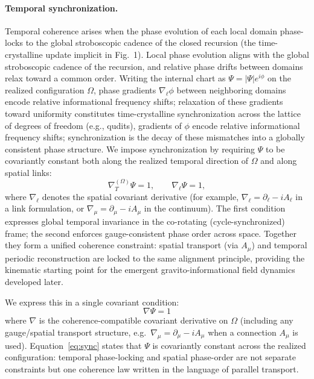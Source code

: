 \documentclass[11pt]{article}
\begin{document}
\paragraph{Temporal synchronization.}
Temporal coherence arises when the phase evolution of each local domain phase-locks to the global stroboscopic cadence of the closed recursion (the time-crystalline update implicit in Fig.~1). Local phase evolution aligns with the global stroboscopic
cadence of the recursion, and relative phase drifts between domains relax toward a common order. Writing the internal chart as $\Psi=|\Psi|e^{i\phi}$ on the realized configuration $\Omega$, phase gradients $\nabla_{\ell}\phi$ between neighboring domains encode relative informational frequency shifts; relaxation of these gradients toward uniformity constitutes time-crystalline synchronization across the lattice of degrees of freedom (e.g., qudits), gradients of $\phi$ encode relative informational frequency shifts; synchronization is the decay of these mismatches into a globally consistent phase structure.
We impose synchronization by requiring $\Psi$ to be covariantly constant both along the realized temporal direction of $\Omega$ and along spatial links:
\begin{equation}
\nabla^{(\Omega)}_{T}\Psi = 1,
\qquad
\nabla_{\ell}\Psi = 1,
\label{eq:temporal-sync}
\end{equation}
where $\nabla_{\ell}$ denotes the spatial covariant derivative (for example, $\nabla_{\ell}=\partial_{\ell}-iA_{\ell}$ in a link formulation, or $\nabla_{\mu}=\partial_{\mu}-iA_{\mu}$ in the continuum). The first condition expresses global temporal invariance in the co-rotating (cycle-synchronized) frame; the second enforces gauge-consistent phase order across space. Together they form a unified coherence constraint: spatial transport (via $A_\mu$) and temporal periodic reconstruction are locked to the same alignment principle, providing the kinematic starting point for the emergent gravito-informational field dynamics developed later.

We express this in a single covariant condition:
\begin{equation}
\boxed{\;\nabla \Psi = 1\;}
\label{eq:sync}
\end{equation}
where $\nabla$ is the coherence-compatible covariant derivative on $\Omega$ (including any gauge/spatial transport structure, e.g.\ $\nabla_\mu=\partial_\mu-iA_\mu$ when a connection $A_\mu$ is used). Equation~\eqref{eq:sync} states that $\Psi$ is covariantly constant across the realized configuration: temporal phase-locking and spatial phase-order are not separate constraints but one coherence law written in the language of parallel transport.
\end{document}
